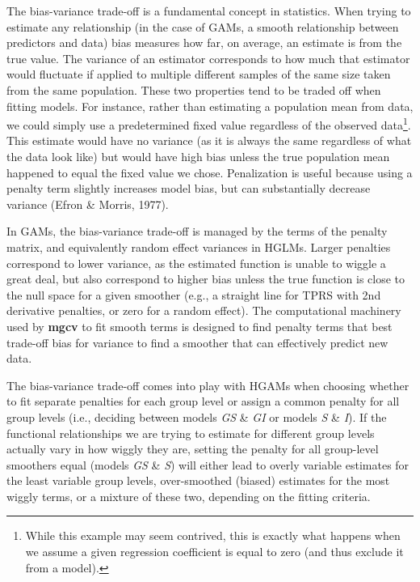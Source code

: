 \documentclass[12pt]{article}
\let\rmarkdownfootnote\footnote%
\def\footnote{\protect\rmarkdownfootnote}
\begin{document}
The bias-variance trade-off is a fundamental concept in statistics. When
trying to estimate any relationship (in the case of GAMs, a smooth
relationship between predictors and data) bias measures how far, on
average, an estimate is from the true value. The variance of an
estimator corresponds to how much that estimator would fluctuate if
applied to multiple different samples of the same size taken from the
same population. These two properties tend to be traded off when fitting
models. For instance, rather than estimating a population mean from
data, we could simply use a predetermined fixed value regardless of the
observed data\footnote{While this example may seem contrived, this is
  exactly what happens when we assume a given regression coefficient is
  equal to zero (and thus exclude it from a model).}. This estimate
would have no variance (as it is always the same regardless of what the
data look like) but would have high bias unless the true population mean
happened to equal the fixed value we chose. Penalization is useful
because using a penalty term slightly increases model bias, but can
substantially decrease variance (Efron \& Morris, 1977).

In GAMs, the bias-variance trade-off is managed by the terms of the
penalty matrix, and equivalently random effect variances in HGLMs.
Larger penalties correspond to lower variance, as the estimated function
is unable to wiggle a great deal, but also correspond to higher bias
unless the true function is close to the null space for a given smoother
(e.g., a straight line for TPRS with 2nd derivative penalties, or zero
for a random effect). The computational machinery used by \textbf{mgcv}
to fit smooth terms is designed to find penalty terms that best
trade-off bias for variance to find a smoother that can effectively
predict new data.

The bias-variance trade-off comes into play with HGAMs when choosing
whether to fit separate penalties for each group level or assign a
common penalty for all group levels (i.e., deciding between models
\emph{GS} \& \emph{GI} or models \emph{S} \& \emph{I}). If the
functional relationships we are trying to estimate for different group
levels actually vary in how wiggly they are, setting the penalty for all
group-level smoothers equal (models \emph{GS} \& \emph{S}) will either
lead to overly variable estimates for the least variable group levels,
over-smoothed (biased) estimates for the most wiggly terms, or a mixture
of these two, depending on the fitting criteria.
\end{document}
